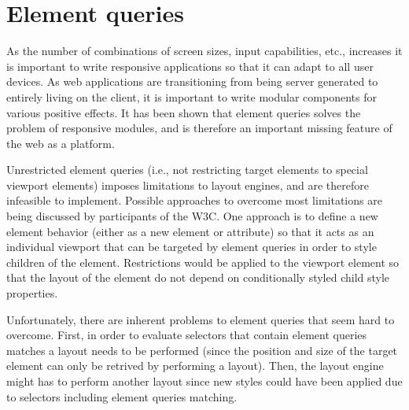 \documentclass[a4paper,11pt]{kth-mag}
\begin{document}






    \section{Element queries}
    As the number of combinations of screen sizes, input capabilities, etc., increases it is important to write responsive applications so that it can adapt to all user devices.
    As web applications are transitioning from being server generated to entirely living on the client, it is important to write modular components for various positive effects.
    It has been shown that element queries solves the problem of responsive modules, and is therefore an important missing feature of the web as a platform.

    Unrestricted element queries (i.e., not restricting target elements to special viewport elements) imposes limitations to layout engines, and are therefore infeasible to implement.
    Possible approaches to overcome most limitations are being discussed by participants of the W3C.
    One approach is to define a new element behavior (either as a new element or attribute) so that it acts as an individual viewport that can be targeted by element queries in order to style children of the element.
    Restrictions would be applied to the viewport element so that the layout of the element do not depend on conditionally styled child style properties.

    Unfortunately, there are inherent problems to element queries that seem hard to overcome.
    First, in order to evaluate selectors that contain element queries matches a layout needs to be performed (since the position and size of the target element can only be retrived by performing a layout).
    Then, the layout engine might has to perform another layout since new styles could have been applied due to selectors including element queries matching.
\end{document}

